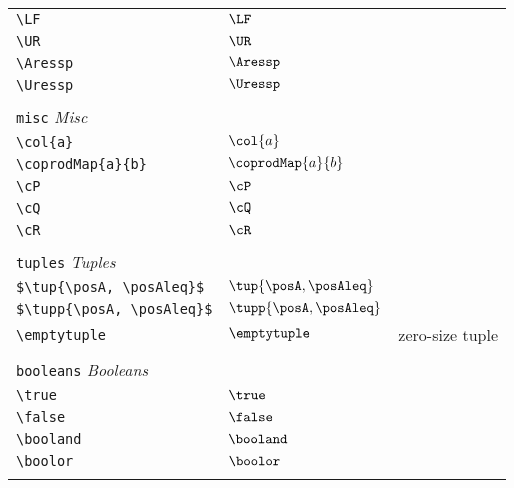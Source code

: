 \begin{longtable}{lll}
 \hline
\hline
{\color[rgb]{0.5,0.5,0.5}\texttt{\textbackslash LF}} & $\LF$ & \\ 
 {\color[rgb]{0.5,0.5,0.5}\texttt{\textbackslash UR}} & $\UR$ & \\ 
 {\color[rgb]{0.5,0.5,0.5}\texttt{\textbackslash Aressp}} & $\Aressp$ & \\ 
 {\color[rgb]{0.5,0.5,0.5}\texttt{\textbackslash Uressp}} & $\Uressp$ & \\ 
  &  & \\ 
 \multicolumn{3}{l}{{\color[rgb]{0.5,0.5,0.5}\texttt{misc}} \emph{Misc}}\\ 
 \hline
\hline
{\color[rgb]{0.5,0.5,0.5}\texttt{\textbackslash col\{a\}}} & $\col{a}$ & \\ 
 {\color[rgb]{0.5,0.5,0.5}\texttt{\textbackslash coprodMap\{a\}\{b\}}} & $\coprodMap{a}{b}$ & \\ 
 {\color[rgb]{0.5,0.5,0.5}\texttt{\textbackslash cP}} & $\cP$ & \\ 
 {\color[rgb]{0.5,0.5,0.5}\texttt{\textbackslash cQ}} & $\cQ$ & \\ 
 {\color[rgb]{0.5,0.5,0.5}\texttt{\textbackslash cR}} & $\cR$ & \\ 
  &  & \\ 
 \multicolumn{3}{l}{{\color[rgb]{0.5,0.5,0.5}\texttt{tuples}} \emph{Tuples}}\\ 
 \hline
\hline
{\color[rgb]{0.5,0.5,0.5}\texttt{\$\textbackslash tup\{\textbackslash posA, \textbackslash posAleq\}\$}} & $\tup{\posA, \posAleq}$ & \\ 
 {\color[rgb]{0.5,0.5,0.5}\texttt{\$\textbackslash tupp\{\textbackslash posA, \textbackslash posAleq\}\$}} & $\tupp{\posA, \posAleq}$ & \\ 
 {\color[rgb]{0.5,0.5,0.5}\texttt{\textbackslash emptytuple}} & $\emptytuple$ &  zero-size tuple\\ 
  &  & \\ 
 \multicolumn{3}{l}{{\color[rgb]{0.5,0.5,0.5}\texttt{booleans}} \emph{Booleans}}\\ 
 \hline
\hline
{\color[rgb]{0.5,0.5,0.5}\texttt{\textbackslash true}} & $\true$ & \\ 
 {\color[rgb]{0.5,0.5,0.5}\texttt{\textbackslash false}} & $\false$ & \\ 
 {\color[rgb]{0.5,0.5,0.5}\texttt{\textbackslash booland}} & $\booland$ & \\ 
 {\color[rgb]{0.5,0.5,0.5}\texttt{\textbackslash boolor}} & $\boolor$ & \\ 
  &  & \\ 

\end{longtable}
